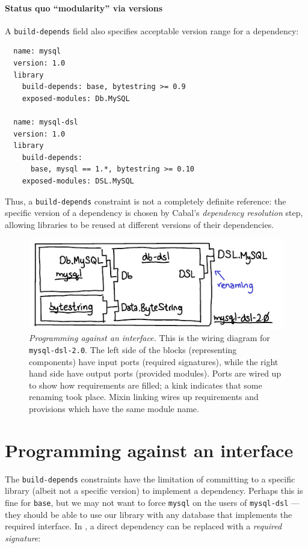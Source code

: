 \paragraph{Status quo ``modularity'' via versions}
A \verb|build-depends| field also specifies acceptable
version range for a dependency:

\begin{verbatim}
  name: mysql
  version: 1.0
  library
    build-depends: base, bytestring >= 0.9
    exposed-modules: Db.MySQL

  name: mysql-dsl
  version: 1.0
  library
    build-depends:
      base, mysql == 1.*, bytestring >= 0.10
    exposed-modules: DSL.MySQL
\end{verbatim}
Thus, a \verb|build-depends| constraint is not a completely definite
reference: the specific version of a dependency is chosen by Cabal's
\emph{dependency resolution} step, allowing libraries to be reused at different
versions of their dependencies.

\begin{figure}
\includegraphics{diagrams/programming-against-interface.pdf}
\caption{\emph{Programming against an interface.} This is the wiring
diagram for \texttt{mysql-dsl-2.0}.  The left side of the blocks
(representing components) have input ports (required signatures),
while the right hand side have output ports (provided modules).  Ports are wired up to show how
requirements are filled; a kink indicates that some renaming took place.
Mixin linking wires up requirements and provisions which have the same
module name.}
\label{fig:programming-against-interface}
\end{figure}

\section{Programming against an interface}

The \verb|build-depends|
constraints have the limitation of committing to a specific
library (albeit not a specific version) to implement a dependency.  Perhaps this is fine for
\verb|base|, but we may not want to force \verb|mysql| on the users of \verb|mysql-dsl|
---they should be able to use our library with any database that
implements the required interface.
In \Backpack{}, a direct dependency can be replaced with a
\emph{required signature}:

